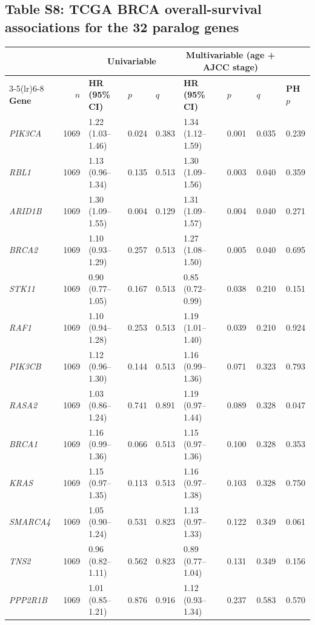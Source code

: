 \documentclass[11pt,a4paper]{article}
\begin{document}
\subsection{Table S8: TCGA BRCA overall-survival associations for the 32 paralog genes}
\begin{table}[H]
\centering
\footnotesize
\begin{tabular}{lrlllllll}
\toprule
 & & \multicolumn{3}{c}{\textbf{Univariable}} & \multicolumn{3}{c}{\textbf{Multivariable (age + AJCC stage)}} & \\
\cmidrule(lr){3-5}\cmidrule(lr){6-8}
\textbf{Gene} & \textbf{$n$} & \textbf{HR (95\% CI)} & \textbf{$p$} & \textbf{$q$} & \textbf{HR (95\% CI)} & \textbf{$p$} & \textbf{$q$} & \textbf{PH $p$} \\
\midrule
\textit{PIK3CA} & 1069 & 1.22 (1.03--1.46) & 0.024 & 0.383 & 1.34 (1.12--1.59) & 0.001 & 0.035 & 0.239 \\
\textit{RBL1} & 1069 & 1.13 (0.96--1.34) & 0.135 & 0.513 & 1.30 (1.09--1.56) & 0.003 & 0.040 & 0.359 \\
\textit{ARID1B} & 1069 & 1.30 (1.09--1.55) & 0.004 & 0.129 & 1.31 (1.09--1.57) & 0.004 & 0.040 & 0.271 \\
\textit{BRCA2} & 1069 & 1.10 (0.93--1.29) & 0.257 & 0.513 & 1.27 (1.08--1.50) & 0.005 & 0.040 & 0.695 \\
\textit{STK11} & 1069 & 0.90 (0.77--1.05) & 0.167 & 0.513 & 0.85 (0.72--0.99) & 0.038 & 0.210 & 0.151 \\
\textit{RAF1} & 1069 & 1.10 (0.94--1.28) & 0.253 & 0.513 & 1.19 (1.01--1.40) & 0.039 & 0.210 & 0.924 \\
\textit{PIK3CB} & 1069 & 1.12 (0.96--1.30) & 0.144 & 0.513 & 1.16 (0.99--1.36) & 0.071 & 0.323 & 0.793 \\
\textit{RASA2} & 1069 & 1.03 (0.86--1.24) & 0.741 & 0.891 & 1.19 (0.97--1.44) & 0.089 & 0.328 & 0.047 \\
\textit{BRCA1} & 1069 & 1.16 (0.99--1.36) & 0.066 & 0.513 & 1.15 (0.97--1.36) & 0.100 & 0.328 & 0.353 \\
\textit{KRAS} & 1069 & 1.15 (0.97--1.35) & 0.113 & 0.513 & 1.16 (0.97--1.38) & 0.103 & 0.328 & 0.750 \\
\textit{SMARCA4} & 1069 & 1.05 (0.90--1.24) & 0.531 & 0.823 & 1.13 (0.97--1.33) & 0.122 & 0.349 & 0.061 \\
\textit{TNS2} & 1069 & 0.96 (0.82--1.11) & 0.562 & 0.823 & 0.89 (0.77--1.04) & 0.131 & 0.349 & 0.156 \\
\textit{PPP2R1B} & 1069 & 1.01 (0.85--1.21) & 0.876 & 0.916 & 1.12 (0.93--1.34) & 0.237 & 0.583 & 0.570 \\

\end{tabular}
\end{table}
\end{document}

